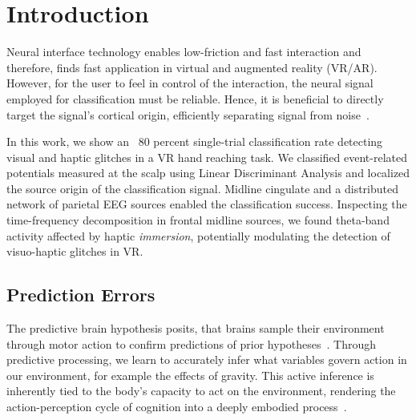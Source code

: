 \section{Introduction}
Neural interface technology enables low-friction and fast interaction and therefore, finds fast application in virtual and augmented reality (VR/AR). However, for the user to feel in control of the interaction, the neural signal employed for classification must be reliable. Hence, it is beneficial to directly target the signal's cortical origin, efficiently separating signal from noise~\cite{Zander2016}.

In this work, we show an ~80 percent single-trial classification rate detecting visual and haptic glitches in a VR hand reaching task. We classified event-related potentials measured at the scalp using Linear Discriminant Analysis and localized the source origin of the classification signal. Midline cingulate and a distributed network of parietal EEG sources enabled the classification success. Inspecting the time-frequency decomposition in frontal midline sources, we found theta-band activity affected by haptic \textit{immersion}, potentially modulating the detection of visuo-haptic glitches in VR.

\subsection{Prediction Errors} %





The predictive brain hypothesis posits, that brains sample their environment through motor action to confirm predictions of prior hypotheses~\cites{Clark2013, Friston2010, Rao1999}. Through predictive processing, we learn to accurately infer what variables govern action in our environment, for example the effects of gravity. This active inference is inherently tied to the body's capacity to act on the environment, rendering the action-perception cycle of cognition into a deeply embodied process~\cite{Friston2012}.

